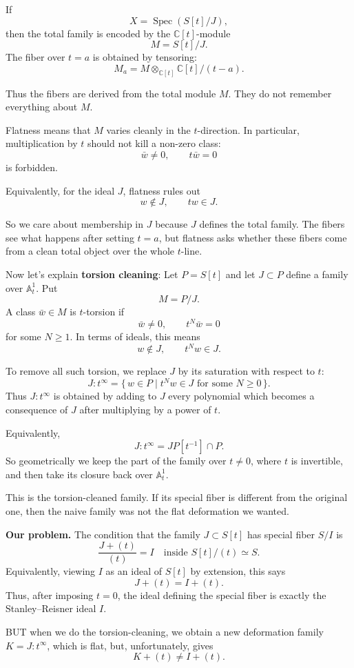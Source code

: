 If
$$
X=\operatorname{Spec}(S[t]/J),
$$
then the total family is encoded by the
$\mathbb{C}[t]$-module
$$
M=S[t]/J.
$$
The fiber over $t=a$ is obtained by tensoring:
$$
M_a
=
M\otimes_{\mathbb{C}[t]}
\mathbb{C}[t]/(t-a).
$$

Thus the fibers are derived from the total
module $M$. They do not remember everything
about $M$.

Flatness means that $M$ varies cleanly in the
$t$-direction. In particular, multiplication
by $t$ should not kill a non-zero class:
$$
\bar w\neq 0,\qquad t\bar w=0
$$
is forbidden.

Equivalently, for the ideal $J$, flatness
rules out
$$
w\notin J,\qquad tw\in J.
$$

So we care about membership in $J$ because
$J$ defines the total family. The fibers see
what happens after setting $t=a$, but
flatness asks whether these fibers come from
a clean total object over the whole
$t$-line.

\medskip\noindent
Now let's explain {\bf torsion cleaning}:
Let $P=S[t]$ and let $J\subset P$ define a
family over $\mathbb{A}^1_t$. Put
$$
M=P/J.
$$
A class $\bar w\in M$ is $t$-torsion if
$$
\bar w\neq 0,\qquad t^N\bar w=0
$$
for some $N\geq 1$. In terms of ideals, this
means
$$
w\notin J,\qquad t^Nw\in J.
$$

To remove all such torsion, we replace $J$
by its saturation with respect to $t$:
$$
J:t^\infty
=
\{\,w\in P\mid t^Nw\in J
\text{ for some }N\geq 0\,\}.
$$
Thus $J:t^\infty$ is obtained by adding to
$J$ every polynomial which becomes a
consequence of $J$ after multiplying by a
power of $t$.

Equivalently,
$$
J:t^\infty=JP[t^{-1}]\cap P.
$$
So geometrically we keep the part of the
family over $t\neq 0$, where $t$ is
invertible, and then take its closure back
over $\mathbb{A}^1_t$.

This is the torsion-cleaned family. If its
special fiber is different from the original
one, then the naive family was not the flat
deformation we wanted.

\medskip\noindent
{\bf Our problem.}
The condition that the family $J\subset S[t]$
has special fiber $S/I$ is
$$
\frac{J+(t)}{(t)}=I
\quad\text{inside }S[t]/(t)\simeq S.
$$
Equivalently, viewing $I$ as an ideal of
$S[t]$ by extension, this says
$$
J+(t)=I+(t).
$$
Thus, after imposing $t=0$, the ideal
defining the special fiber is exactly the
Stanley--Reisner ideal $I$.

BUT when we do the torsion-cleaning,
we obtain a new deformation family
$K = J:t^{\infty}$, which is flat, but,
unfortunately, gives
$$
K+(t) \neq I+(t).
$$

